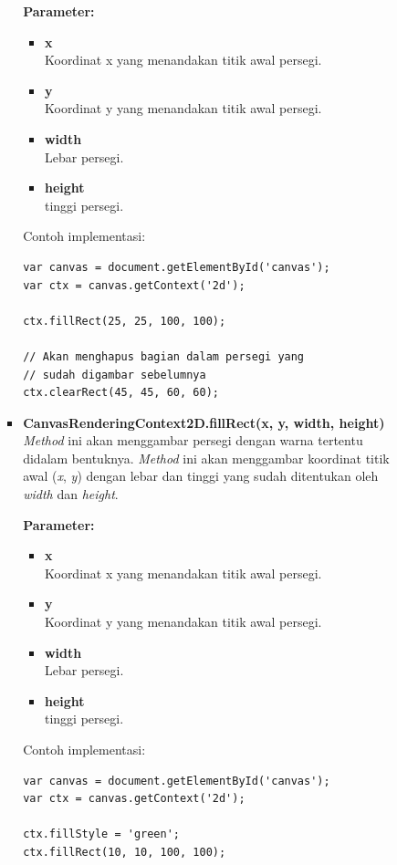 \documentclass[a4paper,twoside]{article}
\begin{document}
\begin{enumerate}
\begin{enumerate}
\begin{enumerate}
\begin{itemize}
					\textbf{Parameter:}
					\begin{itemize}
						\item \textbf{x} \\ Koordinat x yang menandakan titik awal persegi.
						\item \textbf{y} \\ Koordinat y yang menandakan titik awal persegi.
						\item \textbf{width} \\ Lebar persegi.
						\item \textbf{height} \\ tinggi persegi.
					\end{itemize}
					Contoh implementasi:
\begin{lstlisting}
var canvas = document.getElementById('canvas');
var ctx = canvas.getContext('2d');
					
ctx.fillRect(25, 25, 100, 100);
					
// Akan menghapus bagian dalam persegi yang 
// sudah digambar sebelumnya
ctx.clearRect(45, 45, 60, 60); 
\end{lstlisting}
					
					\item \textbf{CanvasRenderingContext2D.fillRect(x, y, width, height)} \\ 
					\textit{Method} ini akan menggambar persegi dengan warna tertentu didalam bentuknya. \textit{Method} ini akan menggambar koordinat titik awal (\textit{x}, \textit{y}) dengan lebar dan tinggi yang sudah ditentukan oleh \textit{width} dan \textit{height}. 
					
					\textbf{Parameter:}
					\begin{itemize}
						\item \textbf{x} \\ Koordinat x yang menandakan titik awal persegi.
						\item \textbf{y} \\ Koordinat y yang menandakan titik awal persegi.
						\item \textbf{width} \\ Lebar persegi.
						\item \textbf{height} \\ tinggi persegi.
					\end{itemize}
					Contoh implementasi:
\begin{lstlisting}
var canvas = document.getElementById('canvas');
var ctx = canvas.getContext('2d');
					
ctx.fillStyle = 'green';
ctx.fillRect(10, 10, 100, 100);
\end{lstlisting}
					

\end{itemize}
\end{enumerate}
\end{enumerate}
\end{enumerate}
\end{document}

